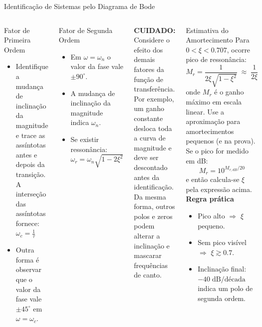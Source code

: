 \begin{frame}{Identificação de Sistemas pelo Diagrama de Bode}
  \scriptsize
  \begin{columns}
    \begin{block}{Fator de Primeira Ordem}
      \begin{itemize}
        \item Identifique a mudança de inclinação da magnitude e trace as assíntotas antes e depois da transição. A interseção das assíntotas fornece: $\omega_c=\frac{1}{\tau}$
        \item Outra forma é observar que o valor da fase vale $\pm45^\circ$ em $\omega=\omega_c$.
      \end{itemize}
    \end{block}
    \begin{block}{Fator de Segunda Ordem}
      \begin{itemize}
        \item Em $\omega=\omega_n$ o valor da fase vale $\pm90^\circ$.
        \item A mudança de inclinação da magnitude indica $\omega_n$.
        \item Se existir ressonância: $\omega_r=\omega_n\sqrt{1-2\xi^2}$
      \end{itemize}
    \end{block}
    {\color{red}\textbf{CUIDADO:}}
    Considere o efeito dos demais fatores da função de transferência. Por exemplo, um ganho constante desloca toda a curva de magnitude e deve ser descontado antes da identificação. Da mesma forma, outros polos e zeros podem alterar a inclinação e mascarar frequências de canto.
    \begin{block}{Estimativa do Amortecimento}
      Para $0<\xi<0.707$, ocorre pico de ressonância:
      $$M_r=\frac{1}{2\xi\sqrt{1-\xi^2}}\;\approx\;\frac{1}{2\xi}$$
      onde $M_r$ é o ganho máximo em escala linear. Use a aproximação para amortecimentos pequenos (e na prova).
      \vspace{0.2cm} \\
      Se o pico for medido em dB:
      $$M_r=10^{M_{r,dB}/20}$$
      \vspace{-0.2cm}
      e então calcula-se $\xi$ pela expressão acima.
      \vspace{0.3cm} \\
      \textbf{Regra prática}
      \begin{itemize}
        \item Pico alto $\Rightarrow$ $\xi$ pequeno.
        \item Sem pico visível $\Rightarrow$ $\xi \gtrsim 0.7$.
        \item Inclinação final: $-40\;\text{dB/década}$ indica um polo de segunda ordem.
      \end{itemize}
    \end{block}
  \end{columns}
\end{frame}

